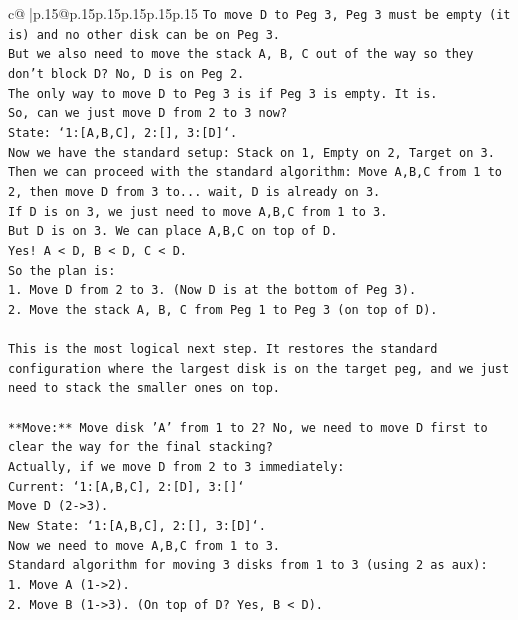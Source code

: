 \documentclass{article}
\begin{document}
{\begin{supertabular}{c@{$\;$}|p{.15\linewidth}@{}p{.15\linewidth}p{.15\linewidth}p{.15\linewidth}p{.15\linewidth}p{.15\linewidth}}
{{{\texttt{To move D to Peg 3, Peg 3 must be empty (it is) and no other disk can be on Peg 3.} \\
\texttt{But we also need to move the stack A, B, C out of the way so they don't block D? No, D is on Peg 2.} \\
\texttt{The only way to move D to Peg 3 is if Peg 3 is empty. It is.} \\
\texttt{So, can we just move D from 2 to 3 now?} \\
\texttt{State: `1:{[}A,B,C{]}, 2:{[}{]}, 3:{[}D{]}`.} \\
\texttt{Now we have the standard setup: Stack on 1, Empty on 2, Target on 3.} \\
\texttt{Then we can proceed with the standard algorithm: Move A,B,C from 1 to 2, then move D from 3 to... wait, D is already on 3.} \\
\texttt{If D is on 3, we just need to move A,B,C from 1 to 3.} \\
\texttt{But D is on 3. We can place A,B,C on top of D.} \\
\texttt{Yes! A < D, B < D, C < D.} \\
\texttt{So the plan is:} \\
\texttt{1. Move D from 2 to 3. (Now D is at the bottom of Peg 3).} \\
\texttt{2. Move the stack A, B, C from Peg 1 to Peg 3 (on top of D).} \\
\\ 
\texttt{This is the most logical next step. It restores the standard configuration where the largest disk is on the target peg, and we just need to stack the smaller ones on top.} \\
\\ 
\texttt{**Move:** Move disk 'A' from 1 to 2? No, we need to move D first to clear the way for the final stacking?} \\
\texttt{Actually, if we move D from 2 to 3 immediately:} \\
\texttt{Current: `1:{[}A,B,C{]}, 2:{[}D{]}, 3:{[}{]}`} \\
\texttt{Move D (2{-}>3).} \\
\texttt{New State: `1:{[}A,B,C{]}, 2:{[}{]}, 3:{[}D{]}`.} \\
\texttt{Now we need to move A,B,C from 1 to 3.} \\
\texttt{Standard algorithm for moving 3 disks from 1 to 3 (using 2 as aux):} \\
\texttt{1. Move A (1{-}>2).} \\
\texttt{2. Move B (1{-}>3). (On top of D? Yes, B < D).} \\
}}}
\end{supertabular}}
\end{document}
